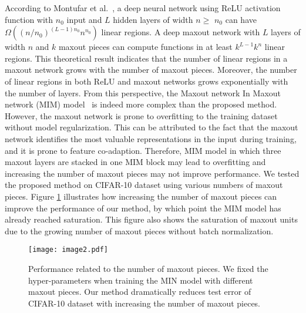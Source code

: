 \documentclass[10pt,twocolumn,letterpaper]{article}
\begin{document}
 According to Montufar et al.~\cite{montufar2014number}, a deep neural network using ReLU activation function with $n_0$ input and $L$ hidden layers of width $n\ge $ $n_0$ can have $\Omega \left({\left({n}/{n_0}\right)}^{\left(L-1\right)n_0}n^{n_0}\right)$ linear regions. A deep maxout network with $L$ layers of width $n$ and $k$ maxout pieces can compute functions in at least $k^{L-1}k^n$ linear regions. This theoretical result indicates that the number of linear regions in a maxout network grows with the number of maxout pieces. Moreover, the number of linear regions in both ReLU and maxout networks grows exponentially with the number of layers. From this perspective, the Maxout network In Maxout network (MIM) model~\cite{liao2015importance} is indeed more complex than the proposed method.
However, the maxout network is prone to overfitting to the training dataset without model regularization. This can be attributed to the fact that the maxout network identifies the most valuable representations in the input during training, and it is prone to feature co-adaption. Therefore, MIM model in which three maxout layers are stacked in one MIM block may lead to overfitting and increasing the number of maxout pieces may not improve performance. We tested the proposed method on CIFAR-10 dataset using various numbers of maxout pieces. Figure \ref{fig:comfig} illustrates how increasing the number of maxout pieces can improve the performance of our method, by which point the MIM model has already reached saturation. This figure also shows the saturation of maxout units due to the growing number of maxout pieces without batch normalization. 

\begin{figure}
\begin{center}
	\texttt{[image: image2.pdf]}
\end{center}
   \caption{Performance related to the number of maxout pieces. We fixed the hyper-parameters when training the MIN model with different maxout pieces. Our method dramatically reduces test error of CIFAR-10 dataset with increasing the number of maxout pieces.}
\label{fig:comfig}
\end{figure}
\end{document}
